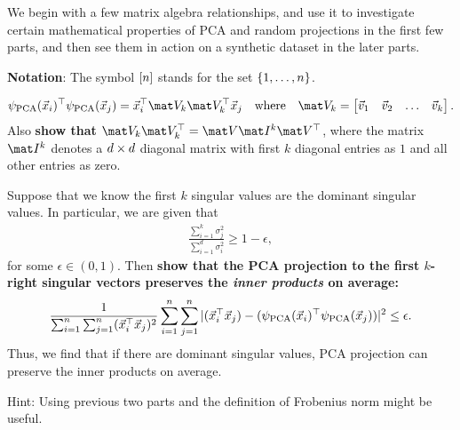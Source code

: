 \documentclass[preview]{standalone}
\begin{document}
We begin with a few matrix algebra relationships, and use it to
investigate certain mathematical properties of PCA and random projections
in the first few parts, and then see them in action on a synthetic dataset
in the later parts.

{\bf Notation}: The symbol $[n]$ stands for the set $\{1, \ldots, n\}$.


\begin{Parts}



\begin{align*}
\psi_{\text{PCA}}(\vec x_i)^\top\psi_\text{PCA}(\vec x_j) =  \vec x_i^\top\mat V_k\mat V_k^\top\vec x_j
\quad
\text{where}
\quad
\mat V_k = \begin{bmatrix}
	\vec v_1 & \vec v_2 & \ldots & \vec v_k
\end{bmatrix}.
\end{align*}
Also {\bf show that $\mat V_k \mat V_k^\top = \mat V \mat I^k \mat V^\top$}, where 
the matrix $\mat I^k$ denotes a $d \times d$ diagonal matrix
with first $k$ diagonal entries as $1$ and all other entries as zero.



\Part Suppose that we know the first $k$ singular values are 
the dominant singular values. In particular, we are given that
\begin{align*}
	\frac{\sum_{i=1}^k \sigma_j^2}{\sum_{i=1}^d \sigma_i^2} \geq 1-\epsilon,
\end{align*}
for some $\epsilon \in (0, 1)$.
Then {\bf show that the PCA projection to the first $k$-right singular vectors
preserves the \emph{inner products} on average:}
\begin{align}
\label{eq:pca_iprod}
	\frac{1}{\sum_{i=1}^n\sum_{j=1}^n(\vec x_i^\top\vec x_j)^2}\sum_{i=1}^n \sum_{j=1}^n \vert (\vec x_i^\top \vec x_j) - (\psi_{\text{PCA}}(\vec x_i)^\top \psi_{\text{PCA}}(\vec x_j)) \vert^2 \leq \epsilon.
\end{align}
Thus, we find that if there are dominant singular values, PCA projection can preserve the inner
products on average. 

Hint: Using previous two parts and the definition of Frobenius norm might be useful.




\end{Parts}
\end{document}
